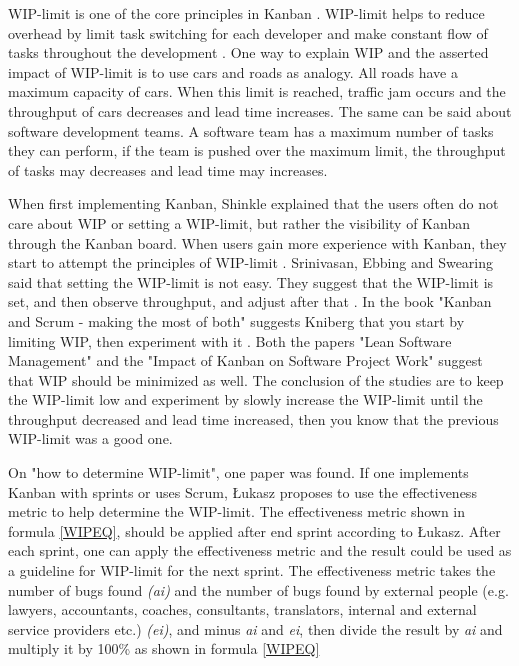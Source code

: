 \documentclass[UKenglish]{ifimaster}  %
\begin{document}
WIP-limit is one of the core principles in Kanban \parencite{6068363}. WIP-limit helps to reduce overhead by limit task switching for each developer and make constant flow of tasks throughout the development \parencite{DavidAnderson}. One way to explain WIP and the asserted impact of WIP-limit is to use cars and roads as analogy. All roads have a maximum capacity of cars. When this limit is reached, traffic jam occurs and the throughput of cars decreases and lead time increases. The same can be said about software development teams. A software team has a maximum number of tasks they can perform, if the team is pushed over the maximum limit, the throughput of tasks may decreases and lead time may increases.

When first implementing Kanban, Shinkle explained that the users often do not care about WIP or setting a WIP-limit, but rather the visibility of Kanban through the Kanban board. When users gain more experience with Kanban, they start to attempt the principles of WIP-limit \parencite{Shinkle}. Srinivasan, Ebbing and Swearing said that setting the WIP-limit is not easy. They suggest that the WIP-limit is set, and then observe throughput, and adjust after that \parencite{Mandyam}. In the book "Kanban and Scrum - making the most of both" suggests Kniberg that you start by limiting WIP, then experiment with it \parencite{Kniberg}. Both the papers "Lean Software Management" \parencite{Kniberg} and the "Impact of Kanban on Software Project Work" \parencite{Ikonen} suggest that WIP should be minimized as well. The conclusion of the studies are to keep the WIP-limit low and experiment by slowly increase the WIP-limit until the throughput decreased and lead time increased, then you know that the previous WIP-limit was a good one.

On "how to determine WIP-limit", one paper was found. If one implements Kanban with sprints or uses Scrum, \L ukasz proposes to use the effectiveness metric to help determine the WIP-limit. The effectiveness metric shown in formula \ref{WIPEQ}, should be applied after end sprint according to \L ukasz. After each sprint, one can apply the effectiveness metric and the result could be used as a guideline for WIP-limit for the next sprint. The effectiveness metric takes the number of bugs found \textit{(ai)} and the number of bugs found by external people (e.g. lawyers, accountants, coaches, consultants, translators, internal and external service providers etc.) \textit{(ei)}, and minus \textit{ai} and \textit{ei}, then divide the result by \textit{ai} and multiply it by 100\%  as shown in formula \ref{WIPEQ} \parencite{Sienkiewicz}
\end{document}
